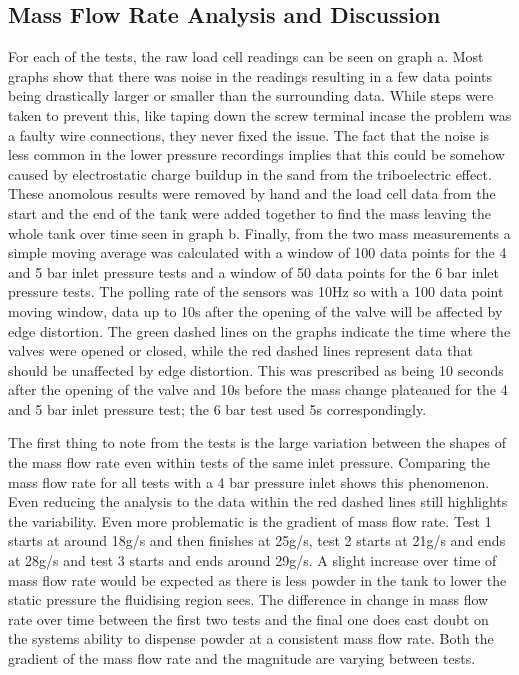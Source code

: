 \subsection{Mass Flow Rate Analysis and Discussion}
For each of the tests, the raw load cell readings can be seen on graph a. Most graphs show that there was noise in the readings resulting in a few data points being drastically larger or smaller than the surrounding data. While steps were taken to prevent this, like taping down the screw terminal incase the problem was a faulty wire connections, they never fixed the issue. The fact that the noise is less common in the lower pressure recordings implies that this could be somehow caused by electrostatic charge buildup in the sand from the triboelectric effect. These anomolous results were removed by hand and the load cell data from the start and the end of the tank were added together to find the mass leaving the whole tank over time seen in graph b. Finally, from the two mass measurements a simple moving average was calculated with a window of 100 data points for the 4 and 5 bar inlet pressure tests and a window of 50 data points for the 6 bar inlet pressure tests. The polling rate of the sensors was 10Hz so with a 100 data point moving window, data up to 10s after the opening of the valve will be affected by edge distortion. The green dashed lines on the graphs indicate the time where the valves were opened or closed, while the red dashed lines represent data that should be unaffected by edge distortion. This was prescribed as being 10 seconds after the opening of the valve and 10s before the mass change plateaued for the 4 and 5 bar inlet pressure test; the 6 bar test used 5s correspondingly.

The first thing to note from the tests is the large variation between the shapes of the mass flow rate even within tests of the same inlet pressure. Comparing the mass flow rate for all tests with a 4 bar pressure inlet shows this phenomenon.  Even reducing the analysis to the data within the red dashed lines still highlights the variability. Even more problematic is the gradient of mass flow rate. Test 1 starts at around 18g/s and then finishes at 25g/s, test 2 starts at 21g/s and ends at 28g/s and test 3 starts and ends around 29g/s. A slight increase over time of mass flow rate would be expected as there is less powder in the tank to lower the static pressure the fluidising region sees. The difference in change in mass flow rate over time between the first two tests and the final one does cast doubt on the systems ability to dispense powder at a consistent mass flow rate. Both the gradient of the mass flow rate and the magnitude are varying between tests.

